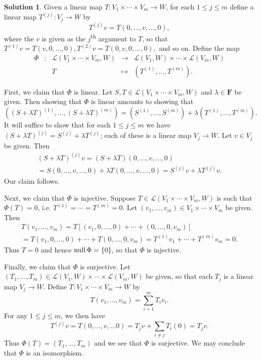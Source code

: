 \documentclass[12pt]{article}
\theoremstyle{definition}
\theoremstyle{exercise}
\theoremstyle{solution}
\newtheorem*{solution}{Solution}
\newcommand{\lmap}{\mathcal{L}}
\newcommand{\ts}{\textsuperscript}
\newcommand{\Null}{\text{null\,}}
\newcommand{\F}{\mathbf{F}}
\begin{document}
\begin{solution}
    Given a linear map \( T : V_1 \times \cdots \times V_m \to W \), for each \( 1 \leq j \leq m \) define a linear map \( T^{(j)} : V_j \to W \) by
    \[
        T^{(j)} v = T(0, \ldots, v, \ldots, 0),
    \]
    where the \( v \) is given as the \(j\)\ts{th} argument to \( T \), so that \( T^{(1)} v = T(v, 0, \ldots, 0), T^{(2)} v = T(0, v, 0, \ldots, 0), \) and so on. Define the map
    {\arraycolsep=1.8pt\def\arraystretch{1.5}
    \[
        \begin{array}{ccrcl}
            \Phi & : & \lmap(V_1 \times \cdots \times V_m, W) & \to & \lmap(V_1, W) \times \cdots \times \lmap(V_m, W) \\
            & & T & \mapsto & (T^{(1)}, \ldots, T^{(m)}).
        \end{array}
    \]}

    First, we claim that \( \Phi \) is linear. Let \( S, T \in \lmap(V_1 \times \cdots \times V_m, W) \) and \( \lambda \in \F \) be given. Then showing that \( \Phi \) is linear amounts to showing that
    \[
        ((S + \lambda T)^{(1)}, \ldots, (S + \lambda T)^{(m)}) = (S^{(1)}, \ldots, S^{(m)}) + \lambda (T^{(1)}, \ldots, T^{(m)}).
    \]
    It will suffice to show that for each \( 1 \leq j \leq m \) we have \( (S + \lambda T)^{(j)} = S^{(j)} + \lambda T^{(j)} \); each of these is a linear map \( V_j \to W \). Let \( v \in V_j \) be given. Then
    \begin{multline*}
        (S + \lambda T)^{(j)} v = (S + \lambda T)(0, \ldots, v, \ldots, 0) \\ = S(0, \ldots, v, \ldots, 0) + \lambda T(0, \ldots, v, \ldots, 0) = S^{(j)} v + \lambda T^{(j)} v.
    \end{multline*}
    Our claim follows.

    Next, we claim that \( \Phi \) is injective. Suppose \( T \in \lmap(V_1 \times \cdots \times V_m, W) \) is such that \( \Phi(T) = 0 \), i.e. \( T^{(1)} = \cdots = T^{(m)} = 0 \). Let \( (v_1, \ldots, v_m) \in V_1 \times \cdots \times V_m \) be given. Then
    \begin{multline*}
        T(v_1, \ldots, v_m) = T[(v_1, 0, \ldots, 0) + \cdots + (0, \ldots, 0, v_m)] \\ = T(v_1, 0, \ldots, 0) + \cdots + T(0, \ldots, 0, v_m) = T^{(1)} v_1 + \cdots + T^{(m)} v_m = 0.
    \end{multline*}
    Thus \( T = 0 \) and hence \( \Null \Phi = \{ 0 \} \), so that \( \Phi \) is injective.

    Finally, we claim that \( \Phi \) is surjective. Let \( (T_1, \ldots, T_m) \in \lmap(V_1, W) \times \cdots \times \lmap(V_m, W) \) be given, so that each \( T_j \) is a linear map \( V_j \to W \). Define \( T : V_1 \times \cdots \times V_m \to W \) by
    \[
        T(v_1, \ldots, v_m) = \sum_{i=1}^m T_i v_i.
    \]
    For any \( 1 \leq j \leq m \), we then have
    \[
        T^{(j)}v = T(0, \ldots, v, \ldots 0) = T_j v + \sum_{i \neq j} T_i(0) = T_j v.
    \]
    Thus \( \Phi(T) = (T_1, \ldots, T_m) \) and we see that \( \Phi \) is surjective. We may conclude that \( \Phi \) is an isomorphism.
\end{solution}
\end{document}
